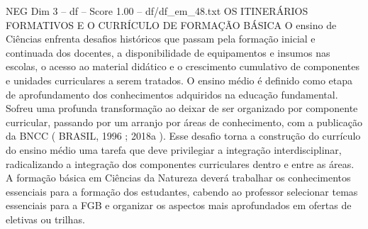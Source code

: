 \begin{textsample}{NEG Dim 3 – df – Score 1.00 – df/df\_em\_48.txt}  \label{ex:f3_neg_162}
OS ITINERÁRIOS FORMATIVOS E O CURRÍCULO DE FORMAÇÃO BÁSICA O ensino de Ciências enfrenta desafios históricos que passam pela formação inicial e continuada dos docentes, a disponibilidade de equipamentos e insumos nas escolas, o acesso ao material didático e o crescimento cumulativo de componentes e unidades curriculares a serem tratados.
O ensino médio é definido como etapa de aprofundamento dos conhecimentos adquiridos na educação fundamental.
Sofreu uma profunda transformação ao deixar de ser organizado por componente curricular, passando por um arranjo por áreas de conhecimento, com a publicação da BNCC ( BRASIL, 1996 ; 2018a ).
Esse desafio torna a construção do currículo do ensino médio uma tarefa que deve privilegiar a integração interdisciplinar, radicalizando a integração dos componentes curriculares dentro e entre as áreas.
A formação básica em Ciências da Natureza deverá trabalhar os conhecimentos essenciais para a formação dos estudantes, cabendo ao professor selecionar temas essenciais para a FGB e organizar os aspectos mais aprofundados em ofertas de eletivas ou trilhas.

\end{textsample}
